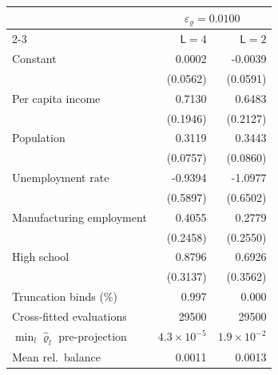 \begin{tabular}{lrr}
\toprule
 & \multicolumn{2}{c}{$\varepsilon_\varrho = 0.0100$} \\
\cmidrule(lr){2-3}
 & $\mathsf L = 4$ & $\mathsf L = 2$ \\
\midrule
Constant & 0.0002 & -0.0039 \\
 & (0.0562) & (0.0591) \\
Per capita income & 0.7130 & 0.6483 \\
 & (0.1946) & (0.2127) \\
Population & 0.3119 & 0.3443 \\
 & (0.0757) & (0.0860) \\
Unemployment rate & -0.9394 & -1.0977 \\
 & (0.5897) & (0.6502) \\
Manufacturing employment & 0.4055 & 0.2779 \\
 & (0.2458) & (0.2550) \\
High school & 0.8796 & 0.6926 \\
 & (0.3137) & (0.3562) \\
\midrule
Truncation binds (\%) & 0.997 & 0.000 \\
Cross-fitted evaluations & 29500 & 29500 \\
$\min_l\hat\varrho_l$ pre-projection & $4.3 \times 10^{-5}$ & $1.9 \times 10^{-2}$ \\
Mean rel.\ balance & 0.0011 & 0.0013 \\
\bottomrule
\end{tabular}
